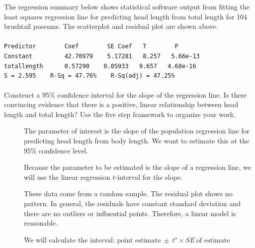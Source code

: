 \begin{examplewrap}
\begin{nexample}{


The regression summary below shows statistical software output from fitting the least squares regression line for predicting head length from total length for 104 brushtail possums.  The scatterplot and residual plot are shown above. 
\\
\\
\texttt{Predictor \ \ \ \ \ \ \ Coef \ \ \ \ \ \ \ SE Coef \ \ T \ \ \ \ \ \ \ P} \\
\texttt{Constant \ \ \ \ \ \ \ \  42.70979 \ \ \ 5.17281 \ \ 8.257 \ \ 5.66e-13} \\
\texttt{total\us{}length\ \ \ \ \ \ 0.57290 \ \ \ 0.05933 \ \ 9.657 \ \ 4.68e-16} \\

\texttt{S = 2.595\ \ \ \ R-Sq = 47.76\% \ \ \ R-Sq(adj) = 47.25\%}
\\
\\
Construct a 95\% confidence interval for the slope of the regression line.  Is there convincing evidence that there is a positive, linear relationship between head length and total length? Use the five step framework to organize your work.}
\begin{description}
\item[] The parameter of interest is the slope of the population regression line for predicting head length from body length.  We want to estimate this at the 95\% confidence level.  
\item[] Because the parameter to be estimated is the slope of a regression line, we will use the linear regression $t$-interval for the slope.
\item[] These data come from a random sample.  The residual plot shows no pattern.  In general, the residuals have constant standard deviation and there are no outliers or influential points.  Therefore, a linear model is reasonable.
\item[]  We will calculate the interval:
$\text{point estimate}\ \pm\ t^{\star} \times SE\ \text{of estimate}$


\end{description}
\end{nexample}
\end{examplewrap}
